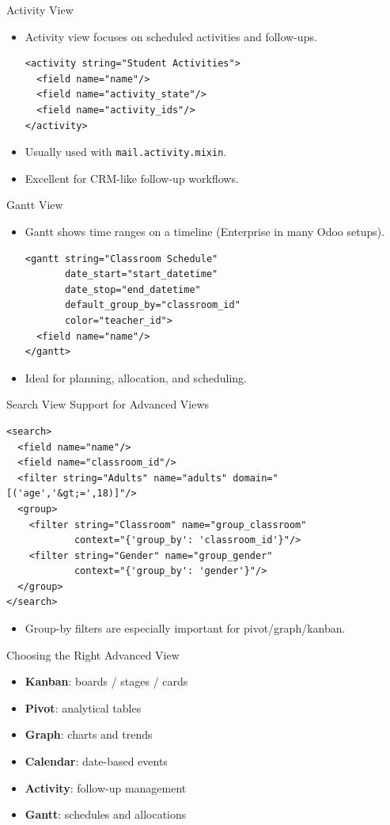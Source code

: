\begin{frame}[fragile]{Activity View}
	\begin{itemize}
		\item Activity view focuses on scheduled activities and follow-ups.
\begin{lstlisting}[style=xml]
<activity string="Student Activities">
  <field name="name"/>
  <field name="activity_state"/>
  <field name="activity_ids"/>
</activity>
\end{lstlisting}
		\item Usually used with \texttt{mail.activity.mixin}.
		\item Excellent for CRM-like follow-up workflows.
	\end{itemize}
\end{frame}

\begin{frame}[fragile]{Gantt View}
	\begin{itemize}
		\item Gantt shows time ranges on a timeline (Enterprise in many Odoo setups).
\begin{lstlisting}[style=xml]
<gantt string="Classroom Schedule"
	   date_start="start_datetime"
	   date_stop="end_datetime"
	   default_group_by="classroom_id"
	   color="teacher_id">
  <field name="name"/>
</gantt>
\end{lstlisting}
		\item Ideal for planning, allocation, and scheduling.
	\end{itemize}
\end{frame}

\begin{frame}[fragile]{Search View Support for Advanced Views}
\begin{lstlisting}[style=xml]
<search>
  <field name="name"/>
  <field name="classroom_id"/>
  <filter string="Adults" name="adults" domain="[('age','&gt;=',18)]"/>
  <group>
	<filter string="Classroom" name="group_classroom"
			context="{'group_by': 'classroom_id'}"/>
	<filter string="Gender" name="group_gender"
			context="{'group_by': 'gender'}"/>
  </group>
</search>
\end{lstlisting}
	\begin{itemize}
		\item Group-by filters are especially important for pivot/graph/kanban.
	\end{itemize}
\end{frame}

\begin{frame}{Choosing the Right Advanced View}
	\begin{itemize}
		\item \textbf{Kanban}: boards / stages / cards
		\item \textbf{Pivot}: analytical tables
		\item \textbf{Graph}: charts and trends
		\item \textbf{Calendar}: date-based events
		\item \textbf{Activity}: follow-up management
		\item \textbf{Gantt}: schedules and allocations
	\end{itemize}
\end{frame}
